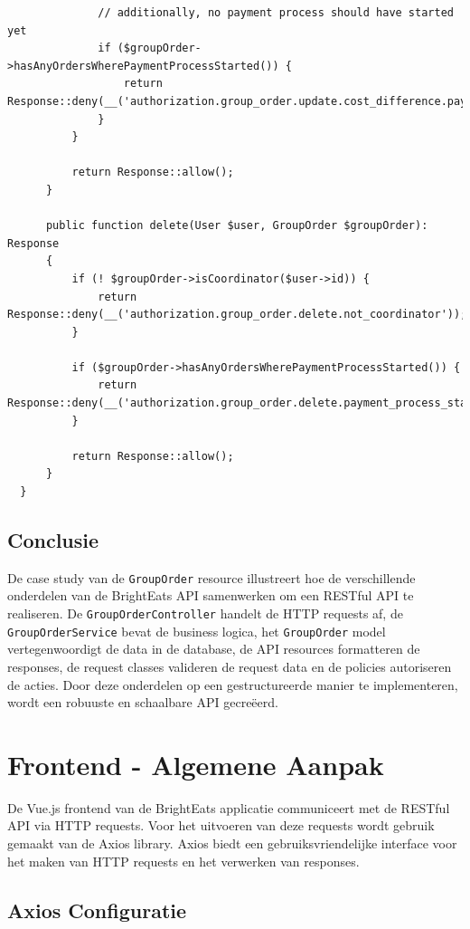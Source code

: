 \begin{verbatim}
              // additionally, no payment process should have started yet
              if ($groupOrder->hasAnyOrdersWherePaymentProcessStarted()) {
                  return Response::deny(__('authorization.group_order.update.cost_difference.payment_process_started'));
              }
          }
  
          return Response::allow();
      }
  
      public function delete(User $user, GroupOrder $groupOrder): Response
      {
          if (! $groupOrder->isCoordinator($user->id)) {
              return Response::deny(__('authorization.group_order.delete.not_coordinator'));
          }
  
          if ($groupOrder->hasAnyOrdersWherePaymentProcessStarted()) {
              return Response::deny(__('authorization.group_order.delete.payment_process_started'));
          }
  
          return Response::allow();
      }
  }
\end{verbatim}
\label{lst:grouporderpolicy}

\subsection{Conclusie}

De case study van de \texttt{GroupOrder} resource illustreert hoe de verschillende onderdelen van de Bright\-Eats API samenwerken om een RESTful API te realiseren. De \texttt{GroupOrderController} handelt de HTTP requests af, de \texttt{GroupOrderService} bevat de business logica, het \texttt{GroupOrder} model vertegenwoordigt de data in de database, de API resources formatteren de responses, de request classes valideren de request data en de policies autoriseren de acties. Door deze onderdelen op een gestructureerde manier te implementeren, wordt een robuuste en schaalbare API gecreëerd.

\section{Frontend - Algemene Aanpak}

De Vue.js frontend van de Bright\-Eats applicatie communiceert met de RESTful API via HTTP requests. Voor het uitvoeren van deze requests wordt gebruik gemaakt van de Axios library. Axios biedt een gebruiksvriendelijke interface voor het maken van HTTP requests en het verwerken van responses.

\subsection{Axios Configuratie}

